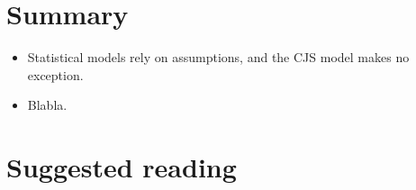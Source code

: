 \documentclass[
  12pt,
]{krantz}
\begin{document}
\hypertarget{summary}{%
\section{Summary}\label{summary}}

\begin{itemize}
\item
  Statistical models rely on assumptions, and the CJS model makes no exception.
\item
  Blabla.
\end{itemize}

\hypertarget{suggested-reading}{%
\section{Suggested reading}\label{suggested-reading}}
\end{document}
